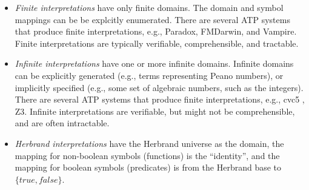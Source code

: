 \documentclass{easychair}
\begin{document}
\begin{itemize}
\item {\em Finite interpretations} have only finite domains.
      The domain and symbol mappings can be be explcitly enumerated.
      There are several ATP systems that produce finite interpretations, e.g., Paradox,
      FMDarwin, and Vampire.
      Finite interpretations are typically verifiable, comprehensible, and tractable.
\item {\em Infinite interpretations} have one or more infinite domains.
      Infinite domains can be explicitly generated (e.g., terms representing Peano numbers), or 
      implicitly specified (e.g., some set of algebraic numbers, such as the integers).
      There are several ATP systems that produce finite interpretations, e.g., 
      cvc5 \cite{BB+22-cvc5}, Z3.
      Infinite interpretations are verifiable, but might not be comprehensible, and are often
      intractable.
\item {\em Herbrand interpretations} \cite{Her30} have the Herbrand universe as the domain, 
      the mapping for non-boolean symbols (functions) is the ``identity'', and the mapping
      for boolean symbols (predicates) is from the Herbrand base to $\{true,false\}$.


\end{itemize}
\end{document}
